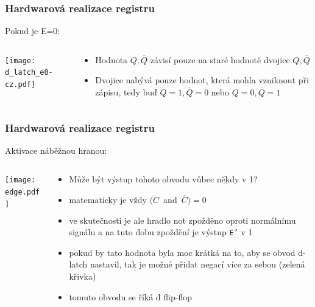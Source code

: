 \documentclass{beamer}
\begin{document}
\begin{frame}
\frametitle{Hardwarová realizace registru}

Pokud je E=0:
\begin{columns}
\begin{column}{0.5\textwidth}
\begin{center}
\texttt{[image: d\_latch\_e0-cz.pdf]}
\end{center}
\end{column}
\begin{column}{0.5\textwidth}  
\begin{itemize}
\item Hodnota $Q,\overline{Q}$ závisí pouze na staré hodnotě dvojice $Q,\overline{Q}$
\item Dvojice nabývá pouze hodnot, která mohla vzniknout při zápisu, tedy buď $Q=1,\overline{Q}=0$ nebo $Q=0,\overline{Q}=1$
\end{itemize}
\end{column}
\end{columns}

\end{frame}

\begin{frame}
\frametitle{Hardwarová realizace registru}

Aktivace náběžnou hranou:
\begin{columns}
\begin{column}{0.45\textwidth}
\begin{center}
\texttt{[image: edge.pdf]}
\end{center}
\end{column}
\begin{column}{0.55\textwidth}  
\begin{itemize}
\item Může být výstup tohoto obvodu vůbec někdy v 1?
\item matematicky je vždy $(C$~and~$\overline{C})=0$ 
\item ve skutečnosti je ale hradlo not zpožděno oproti normálnímu signálu a na tuto dobu zpoždění je výstup \texttt{E'} v 1
\item pokud by tato hodnota byla moc krátká na to, aby se obvod d-latch nastavil, tak je možné přidat negací více za sebou (zelená křivka)
\item tomuto obvodu se říká d flip-flop
\end{itemize}
\end{column}
\end{columns}

\end{frame}
\end{document}
